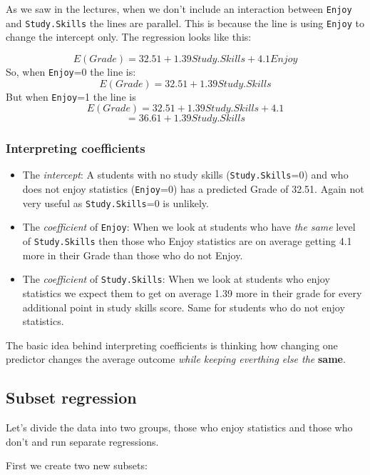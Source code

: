 \documentclass[
]{gitbook}
\providecommand{\tightlist}{%
  \setlength{\itemsep}{0pt}\setlength{\parskip}{0pt}}
\begin{document}
As we saw in the lectures, when we don't include an interaction between \texttt{Enjoy} and \texttt{Study.Skills} the lines are parallel. This is because the line is using \texttt{Enjoy} to change the intercept only. The regression looks like this:

\[ E(Grade) =32.51 + 1.39 Study.Skills + 4.1 Enjoy \]
So, when \texttt{Enjoy}=0 the line is:
\[ E(Grade) =32.51 + 1.39 Study.Skills\]
But when \texttt{Enjoy}=1 the line is
\[ E(Grade)  =32.51 + 1.39 Study.Skills + 4.1\]
\[ = 36.61 + 1.39 Study.Skills\]

\hypertarget{interpreting-coefficients}{%
\subsubsection{Interpreting coefficients}\label{interpreting-coefficients}}

\begin{itemize}
\tightlist
\item
  The \emph{intercept}: A students with no study skills (\texttt{Study.Skills}=0) and who does not enjoy statistics (\texttt{Enjoy}=0) has a predicted Grade of 32.51. Again not very useful as \texttt{Study.Skills}=0 is unlikely.
\item
  The \emph{coefficient} of \texttt{Enjoy}: When we look at students who have \emph{the same} level of \texttt{Study.Skills} then those who Enjoy statistics are on average getting 4.1 more in their Grade than those who do not Enjoy.
\item
  The \emph{coefficient} of \texttt{Study.Skills}: When we look at students who enjoy statistics we expect them to get on average 1.39 more in their grade for every additional point in study skills score. Same for students who do not enjoy statistics.
\end{itemize}

The basic idea behind interpreting coefficients is thinking how changing one predictor changes the average outcome \emph{while keeping everthing else the} \textbf{same}.

\hypertarget{subset-regression}{%
\subsection{Subset regression}\label{subset-regression}}

Let's divide the data into two groups, those who enjoy statistics and those who don't and run separate regressions.

First we create two new subsets:
\end{document}
